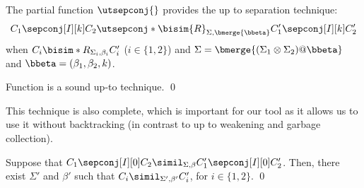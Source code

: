 \begin{definition}[Up to Separation] \label{def:uptosep} %
  The partial function $\utsepconj{}$ provides the up to separation technique:
  \[
    C_1 \sepconj[I][k] C_2 \utsepconj*{\bisim{R}}_{\Sigma,\bmerge{\bbeta}} C_1' \sepconj[I][k] C_2'
  \]
  when
  $C_i \bisim*{R}_{\Sigma_i,\beta_i} C_i'$ ($i\in\{1,2\}$)
  and
  $\Sigma=\bmerge{(\Sigma_1\otimes\Sigma_2)@\bbeta}$
  and
  $\bbeta= (\beta_1,\beta_2,k)$.
\end{definition} %

\begin{lemma}\label{lem:utsepconj-sound}%
  Function \utsepconj{} is a sound up-to technique.
\qed\end{lemma}

This technique is also complete, which is important for our tool as it allows us to use it without backtracking (in contrast to 
up to weakening and garbage collection). %

\begin{lemma}\label{lem:utsepconj-complete}%
  Suppose that
  $C_1 \sepconj[I][0] C_2 \simil_{\Sigma,\beta} C_1' \sepconj[I][0] C_2'$.
  Then, there exist  $\Sigma'$ and $\beta'$ such that
  $C_i \simil_{\Sigma',\beta'} C_i'$, for $i\in\{1,2\}$.
\qed\end{lemma}


